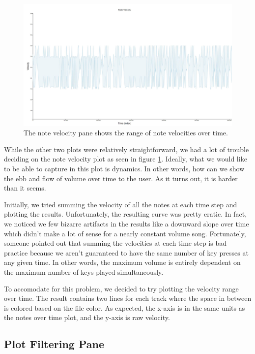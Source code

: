 \documentclass[journal]{vgtc}                %
\begin{document}
\begin{figure}[h]
  \centering
  \includegraphics[width=\columnwidth]{note-velocity-single-track}
  \caption{The note velocity pane shows the range of note velocities over time.}
  \label{fig:note-velocity}
\end{figure}

While the other two plots were relatively straightforward, we had a lot of
trouble deciding on the note velocity plot as seen in figure \ref{fig:note-velocity}.
Ideally, what we would like to be able to capture in this plot is dynamics. In
other words, how can we show the ebb and flow of volume over time to the user.
As it turns out, it is harder than it seems.

Initially, we tried summing the velocity of all the notes at each time step and
plotting the results. Unfortunately, the resulting curve was pretty eratic. In
fact, we noticed we few bizarre artifacts in the results like a downward
slope over time which didn't make a lot of sense for a nearly constant
volume song. Fortunately, someone pointed out that summing the velocities at
each time step is bad practice because we aren't guaranteed to have the same
number of key presses at any given time. In other words, the maximum volume
is entirely dependent on the maximum number of keys played simultaneously.

To accomodate for this problem, we decided to try plotting the velocity range
over time. The result contains two lines for each track where the space in
between is colored based on the file color. As expected, the x-axis is in the
same units as the notes over time plot, and the y-axis is raw velocity.

\subsection{Plot Filtering Pane}
\end{document}
